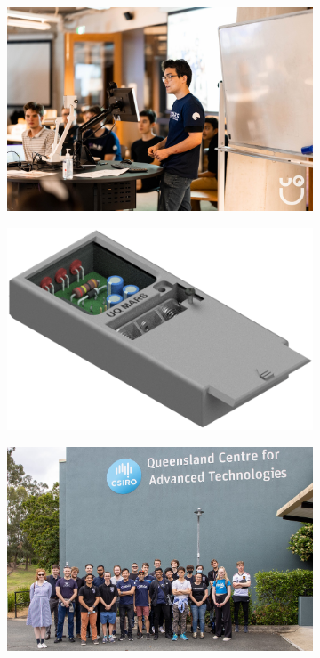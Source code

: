 \documentclass[a4paper,12pt]{report}
\begin{document}
\begin{figure}[H]
    \centering
    \begin{subfigure}{0.32\linewidth}
        \includegraphics[width=0.99\linewidth]{Photos/Hackathon.jpg}
    \end{subfigure}
    \begin{subfigure}{0.32\linewidth}
        \includegraphics[width=0.99\linewidth]{Photos/Torch.png}
    \end{subfigure}
    \begin{subfigure}{0.32\linewidth}
        \includegraphics[width=0.99\linewidth]{Photos/CSIRO.jpg}
    \end{subfigure}
\end{figure}
\end{document}

